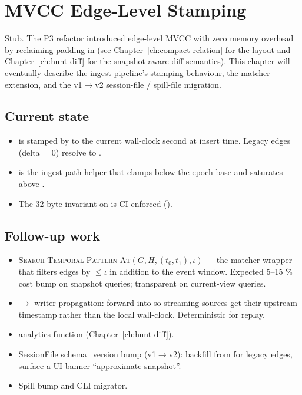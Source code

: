 \chapter{MVCC Edge-Level Stamping}
\label{ch:mvcc}

\begin{note}
Stub. The P3 refactor introduced edge-level MVCC with zero memory
overhead by reclaiming padding in \Compact{}
(see Chapter~\ref{ch:compact-relation} for the layout and
Chapter~\ref{ch:hunt-diff} for the snapshot-aware diff
semantics). This chapter will eventually describe the ingest
pipeline's stamping behaviour, the 
matcher extension, and the v1$\to$v2 session-file / spill-file
migration.
\end{note}

\section{Current state}

\begin{itemize}
    \item {} is
        stamped by  to the
        current wall-clock second at insert time. Legacy edges
        (delta = 0) resolve to .
    \item {} is the ingest-path helper
        that clamps below the epoch base and saturates above
        .
    \item The 32-byte invariant on \Compact{} is CI-enforced
        ().
\end{itemize}

\section{Follow-up work}

\begin{itemize}
    \item \textsc{Search-Temporal-Pattern-At}$(G, H, (t_0, t_1),
        \iota)$ --- the matcher wrapper that filters edges by
         $\leq \iota$ in addition to the event
        window. Expected 5--15 \% cost bump on snapshot queries;
        transparent on current-view queries.
    \item {} $\to$ writer propagation: forward
         into 
        so streaming sources get their upstream timestamp rather
        than the local wall-clock. Deterministic for replay.
    \item {} analytics function
        (Chapter~\ref{ch:hunt-diff}).
    \item SessionFile schema\_version bump (v1$\to$v2): backfill
         from  for legacy edges,
        surface a UI banner ``approximate snapshot''.
    \item Spill  bump and CLI migrator.
\end{itemize}

